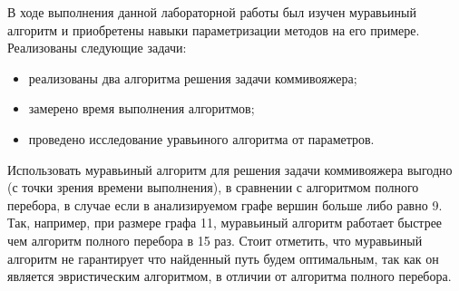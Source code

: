 \Conclusion
    В ходе выполнения данной лабораторной работы был изучен
    муравьиный алгоритм и приобретены навыки параметризации
    методов на его примере. 
    Реализованы следующие задачи:
    \begin{itemize}
        \item реализованы два алгоритма решения задачи коммивояжера;
        \item замерено время выполнения алгоритмов;
        \item проведено исследование уравьиного алгоритма от параметров.
    \end{itemize}
    
    Использовать муравьиный алгоритм для решения задачи коммивояжера выгодно (с точки зрения времени выполнения),
    в сравнении с алгоритмом полного перебора, в случае если в анализируемом графе вершин больше либо равно 9.
    Так, например, при размере графа 11, муравьиный алгоритм работает быстрее чем алгоритм полного перебора в 15 раз.
    Стоит отметить, что муравьиный алгоритм не гарантирует что найденный путь будем оптимальным,
    так как он является эвристическим алгоритмом, в отличии от алгоритма полного перебора.
    